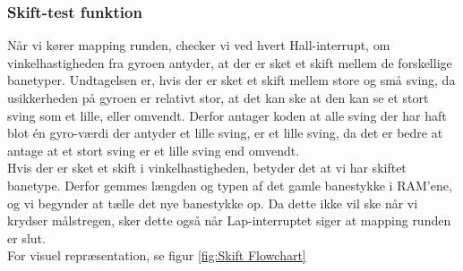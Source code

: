 \subsubsection{Skift-test funktion}

Når vi kører mapping runden, checker vi ved hvert Hall-interrupt, om vinkelhastigheden fra gyroen antyder, at der er sket et skift mellem de forskellige banetyper. Undtagelsen er, hvis der er sket et skift mellem store og små sving, da usikkerheden på gyroen er relativt stor, at det kan ske at den kan se et stort sving som et lille, eller omvendt. Derfor antager koden at alle sving der har haft blot én gyro-værdi der antyder et lille sving, er et lille sving, da det er bedre at antage at et stort sving er et lille sving end omvendt. 
\\
Hvis der er sket et skift i vinkelhastigheden, betyder det at vi har skiftet banetype. Derfor gemmes længden og typen af det gamle banestykke i RAM'ene, og vi begynder at tælle det nye banestykke op. Da dette ikke vil ske når vi krydser målstregen, sker dette også når Lap-interruptet siger at mapping runden er slut.
\\
For visuel repræsentation, se figur \ref{fig:Skift Flowchart}

